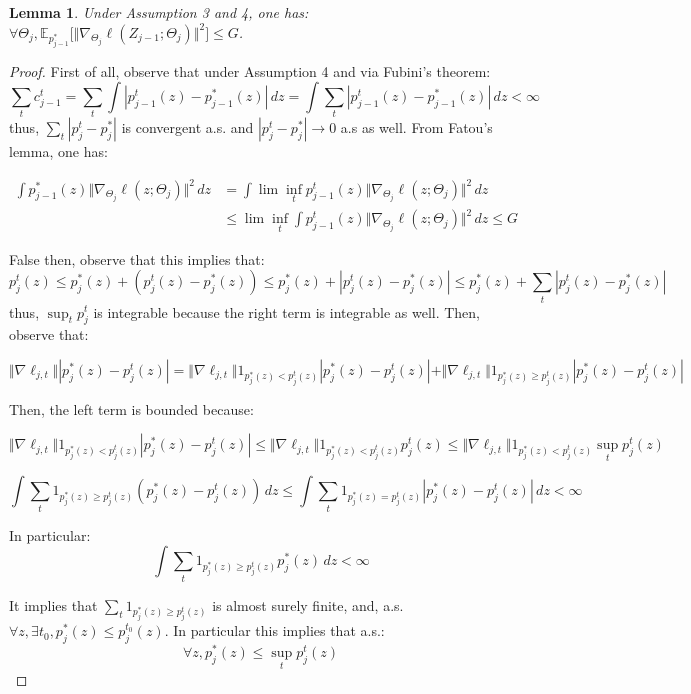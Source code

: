 \documentclass{article}
\newtheorem{lemma}{Lemma}[section]
\begin{document}
\begin{lemma}Under Assumption 3 and 4, one has: $\forall \Theta_j, \mathbb{E}_{p^*_{j-1}}\big[\Vert\nabla_{\Theta_j}\ell(Z_{j-1};\Theta_j)\Vert^2\big]\leq G$.\end{lemma}
\begin{proof}
First of all, observe that under Assumption 4 and via Fubini's theorem:
\begin{equation}
    \sum_t c_{j-1}^t = \sum_t \int |p_{j-1}^t(z)-p_{j-1}^*(z)|\,dz=\int\sum_t |p_{j-1}^t(z)-p_{j-1}^*(z)|\,dz <\infty
\end{equation}
thus, $\sum_t |p_j^t-p_j^*|$ is convergent a.s. and $|p_j^t-p_j^*|\rightarrow 0$ a.s as well. From Fatou's lemma, one has:

\begin{align}
    \int p^*_{j-1}(z)\Vert\nabla_{\Theta_j} \ell(z;\Theta_j)\Vert^2 \,dz&= \int \lim\inf_t p^t_{j-1}(z)\Vert\nabla_{\Theta_j} \ell(z;\Theta_j)\Vert^2 \,dz\\ 
    &\leq \lim\inf_t \int  p^t_{j-1}(z)\Vert\nabla_{\Theta_j} \ell(z;\Theta_j)\Vert^2 \,dz\leq G
\end{align}

\if False
then, observe that this implies that:
\begin{equation}
    p_j^t(z)\leq p_j^*(z)+(p_j^t(z)-p_j^*(z)) \leq p_j^*(z)+ |p_j^t(z)-p_j^*(z)|\leq p_j^*(z)+\sum_t |p_j^t(z)-p_j^*(z)|
\end{equation}
thus, $\sup_t p_j^t$ is integrable because the right term is integrable as well. Then, observe that:

\[ \Vert \nabla\ell_{j,t} \Vert |p^*_j(z)-p^t_j(z)| =  \Vert \nabla\ell_{j,t} \Vert 1_{p^*_j(z)< p^t_j(z)}|p^*_j(z)-p^t_j(z)|+ \Vert \nabla\ell_{j,t} \Vert 1_{p^*_j(z)\geq  p^t_j(z)}|p^*_j(z)-p^t_j(z)|\]

Then, the left term is bounded because:

\begin{equation}
    \Vert \nabla\ell_{j,t} \Vert 1_{p^*_j(z)< p^t_j(z)}|p^*_j(z)-p^t_j(z)|\leq \Vert \nabla\ell_{j,t} \Vert 1_{p^*_j(z)< p^t_j(z)}p^t_j(z) \leq \Vert \nabla\ell_{j,t} \Vert 1_{p^*_j(z)< p^t_j(z)}\sup_t p^t_j(z)
\end{equation}

\[\int \sum_t   1_{p^*_j(z)\geq  p^t_j(z)}(p^*_j(z)-p^t_j(z))\,dz\leq \int \sum_t   1_{p^*_j(z)=  p^t_j(z)}|p^*_j(z)-p^t_j(z)|\,dz<\infty\]

In particular:
\[\int \sum_t   1_{p^*_j(z)\geq  p^t_j(z)}p^*_j(z)\,dz<\infty\]

It implies that $\sum_t   1_{p^*_j(z)\geq  p^t_j(z)}$ is almost surely finite, and, a.s. $\forall z,\exists t_0, p^*_j(z)\leq p^{t_0}_j(z)$. In particular this implies that a.s.:
\[\forall z, p^*_j(z)\leq \sup_t p_j^t(z)\]

\fi


\end{proof}
\end{document}
